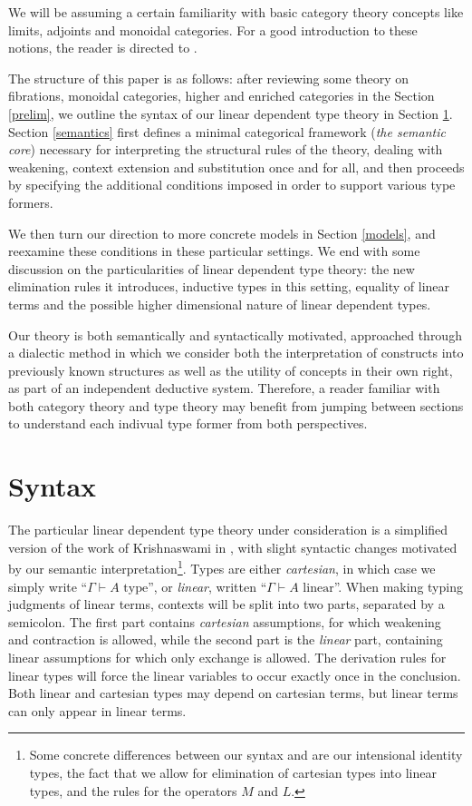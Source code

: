 \documentclass[a4paper,english]{lipics-v2018}
\begin{document}
We will be assuming a certain familiarity with basic category theory concepts like limits, adjoints and monoidal categories. For a good introduction to these notions, the reader is directed to \cite{awodey2010category}.

The structure of this paper is as follows: after reviewing some theory on fibrations, monoidal categories, higher and enriched categories in the Section \ref{prelim}, we outline the syntax of our linear dependent type theory in Section \ref{syntax}. Section \ref{semantics} first defines a minimal categorical framework (\textit{the semantic core}) necessary for interpreting the structural rules of the theory, dealing with weakening, context extension and substitution once and for all, and then proceeds by specifying the additional conditions imposed in order to support various type formers.

We then turn our direction to more concrete models in Section \ref{models}, and reexamine these conditions in these particular settings. We end with some discussion on the particularities of linear dependent type theory: the new elimination rules it introduces, inductive types in this setting, equality of linear terms and the possible higher dimensional nature of linear dependent types.

Our theory is both semantically and syntactically motivated, approached through a dialectic method in which we consider both the interpretation of constructs into previously known structures as well as the utility of concepts in their own right, as part of an independent deductive system. Therefore, a reader familiar with both category theory and type theory may benefit from jumping between sections to understand each indivual type former from both perspectives.
\newpage
\section{Syntax}\label{syntax}
The particular linear dependent type theory under consideration is a simplified version of the work of Krishnaswami in \cite{krishnaswami}, with slight syntactic changes motivated by our semantic interpretation\footnote{Some concrete differences between our syntax and \cite{krishnaswami} are our intensional identity types, the fact that we allow for elimination of cartesian types into linear types, and the rules for the operators $M$ and $L$.}. Types are either \textit{cartesian}, in which case we simply write ``$\Gamma \vdash A \text{ type}$'', or \textit{linear}, written ``$\Gamma \vdash A \text{ linear}$''. When making typing judgments of linear terms, contexts will be split into two parts, separated by a semicolon. The first part contains \textit{cartesian} assumptions, for which weakening and contraction is allowed, while the second part is the \textit{linear} part, containing linear assumptions for which only exchange is allowed. The derivation rules for linear types will force the linear variables to occur exactly once in the conclusion. Both linear and cartesian types may depend on cartesian terms, but linear terms can only appear in linear terms.
\end{document}
